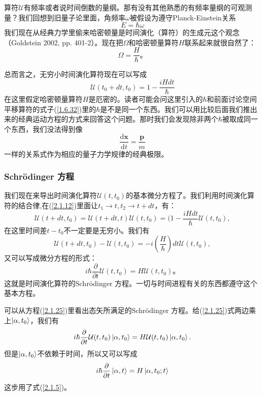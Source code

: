 \documentclass[UTF8,twoside]{ctexart}
\newcommand{\cu}{\mathcal{U}}
\newcommand{\ud}{\mathrm{d}}
\begin{document}
算符$\cu$有频率或者说时间倒数的量纲。那有没有其他熟悉的有频率量纲的可观测量？我们回想到旧量子论里面，角频率$\omega$被假设为遵守Planck-Einstein关系
\begin{equation}\label{2.1.19}
E=\hbar\omega
\end{equation}
我们现在从经典力学里偷来哈密顿量是时间演化（算符）的生成元这个观念（Goldstein 2002,%
pp. 401-2）。现在把$\Omega$和哈密顿量算符$H$联系起来就很自然了：
\begin{equation}\label{2.1.20}
\Omega=\frac{H}{\hbar}。
\end{equation}

总而言之，无穷小时间演化算符现在可以写成
\begin{equation}\label{2.1.21}
\cu(t_0+dt,t_0)=1-\frac{iHdt}{\hbar}
\end{equation}
在这里假定哈密顿量算符$H$是厄密的。读者可能会问这里引入的$\hbar$和前面讨论空间平移算符的式子(\ref{1.6.32})里的$\hbar$是不是同一个东西。我们可以用比较后面我们推出来的经典运动方程的方式来回答这个问题。那时我们会发现除非两个$\hbar$被取成同一个东西，我们没法得到像
\begin{equation}\label{2.1.22}
\frac{\ud {\mathbf x}}{\ud t}=\frac{\mathbf p}{m}
\end{equation}
一样的关系式作为相应的量子力学规律的经典极限。
\subsubsection{Schr\"{o}dinger 方程}
我们现在来导出时间演化算符$\cu(t,t_0)$的基本微分方程了。我们利用时间演化算符的结合律,在(\ref{2.1.12})里面让$t_1\rightarrow t,t_2 \rightarrow t+dt$，有：
\begin{equation}\label{2.1.23}
\cu(t+dt,t_0)=\cu(t+dt,t)\cu(t,t_0)=(1-\frac{iHdt}{\hbar}\cu(t,t_0),
\end{equation}
在这里时间差$t-t_0$不一定要是无穷小。我们有
\begin{equation}\label{2.1.24}
\cu(t+dt,t_0)-\cu(t,t_0)=-i\left(\frac{H}{\hbar}\right)dt\cu(t,t_0),
\end{equation}
又可以写成微分方程的形式：
\begin{equation}\label{2.1.25}
i\hbar \frac{\partial}{\partial t}\cu(t,t_0)=H\cu(t,t_0)。
\end{equation}
这就是时间演化算符的Schr\"{o}dinger 方程。一切与时间进程有关的东西都遵守这个基本方程。

可以从方程(\ref{2.1.25})里看出态矢所满足的Schr\"{o}dinger 方程。给(\ref{2.1.25})式两边乘上$\ket{\alpha,t_0}$，我们有
\begin{equation}\label{2.1.26}
i\hbar \frac{\partial}{\partial t}\cu(t,t_0)\ket{\alpha,t_0}=H\cu(t,t_0)\ket{\alpha,t_0}.
\end{equation}
但是$\ket{\alpha,t_0}$不依赖于时间，所以又可以写成
\begin{equation}\label{2.1.27}
i\hbar \frac{\partial}{\partial t}\ket{\alpha,t}=H\ket{\alpha,t_0;t}
\end{equation}
这步用了式(\ref{2.1.5})。
\end{document}
